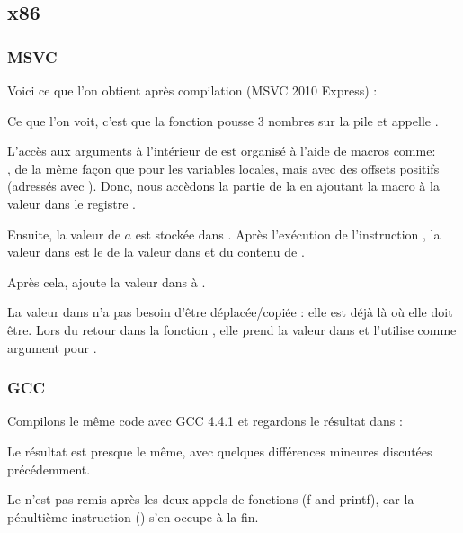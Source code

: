 \subsection{x86}

\subsubsection{MSVC}

Voici ce que l'on obtient après compilation (MSVC 2010 Express) :




Ce que l'on voit, c'est que la fonction \main pousse 3 nombres sur la pile et appelle
.

L'accès aux arguments à l'intérieur de \ttf est organisé à l'aide de macros
comme:\\
,
de la même façon que pour les variables locales, mais avec des offsets positifs
(adressés avec ).
Donc, nous accèdons la partie  de la 
en ajoutant la macro  à la valeur dans le registre \EBP.


Ensuite, la valeur de $a$ est stockée dans \EAX. Après l'exécution de l'instruction
\IMUL, la valeur dans \EAX est le  de la valeur dans \EAX
et du contenu de .

Après cela, \ADD ajoute la valeur dans  à \EAX.

La valeur dans \EAX n'a pas besoin d'être déplacée/copiée : elle est déjà là
où elle doit être.
Lors du retour dans la fonction , elle prend la valeur dans
\EAX et l'utilise comme argument pour \printf.



\subsubsection{GCC}

Compilons le même code avec GCC 4.4.1 et regardons le résultat dans \IDA :



Le résultat est presque le même, avec quelques différences mineures discutées
précédemment.

Le  n'est pas remis après les deux appels
de fonctions (f and printf), car la pénultième instruction  ()
s'en occupe à la fin.
